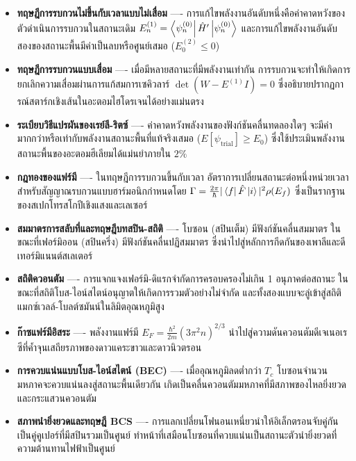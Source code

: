 \begin{itemize}
    \item \textbf{ทฤษฎีการรบกวนไม่ขึ้นกับเวลาแบบไม่เสื่อม} ---- การแก้ไขพลังงานอันดับหนึ่งคือค่าคาดหวังของตัวดำเนินการรบกวนในสถานะเดิม $E_n^{(1)} = \bra{\psi_n^{(0)}}\hat{H}'\ket{\psi_n^{(0)}}$ และการแก้ไขพลังงานอันดับสองของสถานะพื้นมีค่าเป็นลบหรือศูนย์เสมอ ($E_0^{(2)} \le 0$)
    \item \textbf{ทฤษฎีการรบกวนแบบเสื่อม} ---- เมื่อมีหลายสถานะที่มีพลังงานเท่ากัน การรบกวนจะทำให้เกิดการยกเลิกความเสื่อมผ่านการแก้สมการเซคิวลาร์ $\det(W - E^{(1)}I) = 0$ ซึ่งอธิบายปรากฏการณ์สตาร์กเชิงเส้นในอะตอมไฮโดรเจนได้อย่างแม่นตรง
    \item \textbf{ระเบียบวิธีแปรผันของเรย์ลี-ริตซ์} ---- ค่าคาดหวังพลังงานของฟังก์ชันคลื่นทดลองใดๆ จะมีค่ามากกว่าหรือเท่ากับพลังงานสถานะพื้นที่แท้จริงเสมอ ($E[\psi_{\text{trial}}] \ge E_0$) ซึ่งใช้ประเมินพลังงานสถานะพื้นของอะตอมฮีเลียมได้แม่นยำภายใน $2\%$
    \item \textbf{กฎทองของแฟร์มี} ---- ในทฤษฎีการรบกวนขึ้นกับเวลา อัตราการเปลี่ยนสถานะต่อหนึ่งหน่วยเวลาสำหรับสัญญาณรบกวนแบบฮาร์มอนิกกำหนดโดย $\Gamma = \frac{2\pi}{\hbar} |\bra{f}\hat{F}\ket{i}|^2 \rho(E_f)$ ซึ่งเป็นรากฐานของสเปกโทรสโกปีเชิงแสงและเลเซอร์
    \item \textbf{สมมาตรการสลับที่และทฤษฎีบทสปิน-สถิติ} ---- โบซอน (สปินเต็ม) มีฟังก์ชันคลื่นสมมาตร ในขณะที่เฟอร์มิออน (สปินครึ่ง) มีฟังก์ชันคลื่นปฏิสมมาตร ซึ่งนำไปสู่หลักการกีดกันของเพาลีและดีเทอร์มิแนนต์สเลเตอร์
    \item \textbf{สถิติควอนตัม} ---- การแจกแจงเฟอร์มิ-ดิแรกจำกัดการครอบครองไม่เกิน 1 อนุภาคต่อสถานะ ในขณะที่สถิติโบส-ไอน์สไตน์อนุญาตให้เกิดการรวมตัวอย่างไม่จำกัด และทั้งสองแบบจะลู่เข้าสู่สถิติแมกซ์เวลล์-โบลต์ซมันน์ในลิมิตอุณหภูมิสูง
    \item \textbf{ก๊าซแฟร์มีอิสระ} ---- พลังงานแฟร์มี $E_F = \frac{\hbar^2}{2m}(3\pi^2 n)^{2/3}$ นำไปสู่ความดันควอนตัมดีเจเนอเรซีที่ค้ำจุนเสถียรภาพของดาวแคระขาวและดาวนิวตรอน
    \item \textbf{การควบแน่นแบบโบส-ไอน์สไตน์ (BEC)} ---- เมื่ออุณหภูมิลดต่ำกว่า $T_c$ โบซอนจำนวนมหภาคจะควบแน่นลงสู่สถานะพื้นเดียวกัน เกิดเป็นคลื่นควอนตัมมหภาคที่มีสภาพของไหลยิ่งยวดและกระแสวนควอนตัม
    \item \textbf{สภาพนำยิ่งยวดและทฤษฎี BCS} ---- การแลกเปลี่ยนโฟนอนเหนี่ยวนำให้อิเล็กตรอนจับคู่กันเป็นคู่คูเปอร์ที่มีสปินรวมเป็นศูนย์ ทำหน้าที่เสมือนโบซอนที่ควบแน่นเป็นสถานะตัวนำยิ่งยวดที่ความต้านทานไฟฟ้าเป็นศูนย์
\end{itemize}

